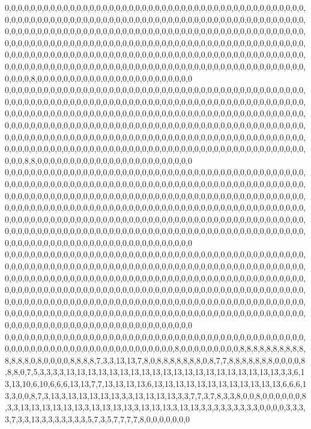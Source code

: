 0,0,0,0,0,0,0,0,0,0,0,0,0,0,0,0,0,0,0,0,0,0,0,0,0,0,0,0,0,0,0,0,0,0,0,0,0,0,0,0,0,0,0,0,0,0,0,0,0,0,0,0,0,0,0,0,0,0,0,0,0,0,0,0,0,0,0,0,0,0,0,0,0,0,0,0,0,0,0,0,0,0,0,0,0,0,0,0,0,0,0,0,0,0,0,0,0,0,0,0,0,0,0,0,0,0,0,0,0,0,0,0,0,0,0,0,0,0,0,0,0,0,0,0,0,0,0,0,0,0,0,0,0,0,0,0,0,0,0,0,0,0,0,0,0,0,0,0,0,0,0,0,0,0,0,0,0,0,0,0,0,0,0,0,0,0,0,0,0,0,0,0,0,0,0,0,0,0,0,0,0,0,0,0,0,0,0,0,0,0,0,0,0,0,0,0,0,0,0,0,0,0,0,0,0,0,0,0,0,0,0,0,0,0,0,0,0,0,0,0,0,0,0,0,0,0,0,0,0,0,0,0,0,0,0,0,0,0,0,0,0,0,0,0,0,0,0,0,0,0,0,0,0,0,0,0,0,0,0,0,0,0,0,0,0,0,0,0,0,0,0,0,0,0,0,0,0,0,0,0,8,0,0,0,0,0,0,0,0,0,0,0,0,0,0,0,0,0,0,0,0,0,0,0,0
0,0,0,0,0,0,0,0,0,0,0,0,0,0,0,0,0,0,0,0,0,0,0,0,0,0,0,0,0,0,0,0,0,0,0,0,0,0,0,0,0,0,0,0,0,0,0,0,0,0,0,0,0,0,0,0,0,0,0,0,0,0,0,0,0,0,0,0,0,0,0,0,0,0,0,0,0,0,0,0,0,0,0,0,0,0,0,0,0,0,0,0,0,0,0,0,0,0,0,0,0,0,0,0,0,0,0,0,0,0,0,0,0,0,0,0,0,0,0,0,0,0,0,0,0,0,0,0,0,0,0,0,0,0,0,0,0,0,0,0,0,0,0,0,0,0,0,0,0,0,0,0,0,0,0,0,0,0,0,0,0,0,0,0,0,0,0,0,0,0,0,0,0,0,0,0,0,0,0,0,0,0,0,0,0,0,0,0,0,0,0,0,0,0,0,0,0,0,0,0,0,0,0,0,0,0,0,0,0,0,0,0,0,0,0,0,0,0,0,0,0,0,0,0,0,0,0,0,0,0,0,0,0,0,0,0,0,0,0,0,0,0,0,0,0,0,0,0,0,0,0,0,0,0,0,0,0,0,0,0,0,0,0,0,0,0,0,0,0,0,0,0,0,0,0,0,0,0,0,8,8,0,0,0,0,0,0,0,0,0,0,0,0,0,0,0,0,0,0,0,0,0,0,0,0
0,0,0,0,0,0,0,0,0,0,0,0,0,0,0,0,0,0,0,0,0,0,0,0,0,0,0,0,0,0,0,0,0,0,0,0,0,0,0,0,0,0,0,0,0,0,0,0,0,0,0,0,0,0,0,0,0,0,0,0,0,0,0,0,0,0,0,0,0,0,0,0,0,0,0,0,0,0,0,0,0,0,0,0,0,0,0,0,0,0,0,0,0,0,0,0,0,0,0,0,0,0,0,0,0,0,0,0,0,0,0,0,0,0,0,0,0,0,0,0,0,0,0,0,0,0,0,0,0,0,0,0,0,0,0,0,0,0,0,0,0,0,0,0,0,0,0,0,0,0,0,0,0,0,0,0,0,0,0,0,0,0,0,0,0,0,0,0,0,0,0,0,0,0,0,0,0,0,0,0,0,0,0,0,0,0,0,0,0,0,0,0,0,0,0,0,0,0,0,0,0,0,0,0,0,0,0,0,0,0,0,0,0,0,0,0,0,0,0,0,0,0,0,0,0,0,0,0,0,0,0,0,0,0,0,0,0,0,0,0,0,0,0,0,0,0,0,0,0,0,0,0,0,0,0,0,0,0,0,0,0,0,0,0,0,0,0,0,0,0,0,0,0,0,0,0,0,0,0,0,0,0,0,0,0,0,0,0,0,0,0,0,0,0,0,0,0,0,0,0,0,0,0,0,0
0,0,0,0,0,0,0,0,0,0,0,0,0,0,0,0,0,0,0,0,0,0,0,0,0,0,0,0,0,0,0,0,0,0,0,0,0,0,0,0,0,0,0,0,0,0,0,0,0,0,0,0,0,0,0,0,0,0,0,0,0,0,0,0,0,0,0,0,0,0,0,0,0,0,0,0,0,0,0,0,0,0,0,0,0,0,0,0,0,0,0,0,0,0,0,0,0,0,0,0,0,0,0,0,0,0,0,0,0,0,0,0,0,0,0,0,0,0,0,0,0,0,0,0,0,0,0,0,0,0,0,0,0,0,0,0,0,0,0,0,0,0,0,0,0,0,0,0,0,0,0,0,0,0,0,0,0,0,0,0,0,0,0,0,0,0,0,0,0,0,0,0,0,0,0,0,0,0,0,0,0,0,0,0,0,0,0,0,0,0,0,0,0,0,0,0,0,0,0,0,0,0,0,0,0,0,0,0,0,0,0,0,0,0,0,0,0,0,0,0,0,0,0,0,0,0,0,0,0,0,0,0,0,0,0,0,0,0,0,0,0,0,0,0,0,0,0,0,0,0,0,0,0,0,0,0,0,0,0,0,0,0,0,0,0,0,0,0,0,0,0,0,0,0,0,0,0,0,0,0,0,0,0,0,0,0,0,0,0,0,0,0,0,0,0,0,0,0,0,0,0,0,0,0,0
0,0,0,0,0,0,0,0,0,0,0,0,0,0,0,0,0,0,0,0,0,0,0,0,0,0,0,0,0,0,0,0,0,0,0,0,0,0,0,0,0,0,0,0,0,0,0,0,0,0,0,0,0,0,0,0,0,0,0,0,0,0,0,0,0,0,0,0,0,0,0,0,8,0,0,0,0,0,0,0,0,0,8,8,8,8,8,8,8,8,8,8,8,8,8,8,0,8,0,0,0,0,8,8,8,8,7,3,3,13,13,7,8,0,8,8,8,8,8,8,8,0,8,7,7,8,8,8,8,8,8,8,0,0,0,0,8,8,8,0,7,5,3,3,3,3,13,13,13,13,13,13,13,13,13,13,13,13,13,13,13,13,13,13,13,13,3,3,6,13,13,10,6,10,6,6,6,13,13,7,7,13,13,13,13,6,13,13,13,13,13,13,13,13,13,13,13,13,6,6,6,13,3,0,0,8,7,3,13,3,13,13,13,13,13,3,3,13,13,13,13,3,3,7,7,3,7,8,3,3,8,0,0,8,0,0,0,0,0,0,8,3,3,13,13,13,13,13,13,3,13,13,13,13,3,13,13,13,3,13,13,3,3,3,3,3,3,3,3,3,0,0,0,0,3,3,3,3,7,3,3,13,3,3,3,3,3,3,3,5,7,3,5,7,7,7,7,8,0,0,0,0,0,0,0

